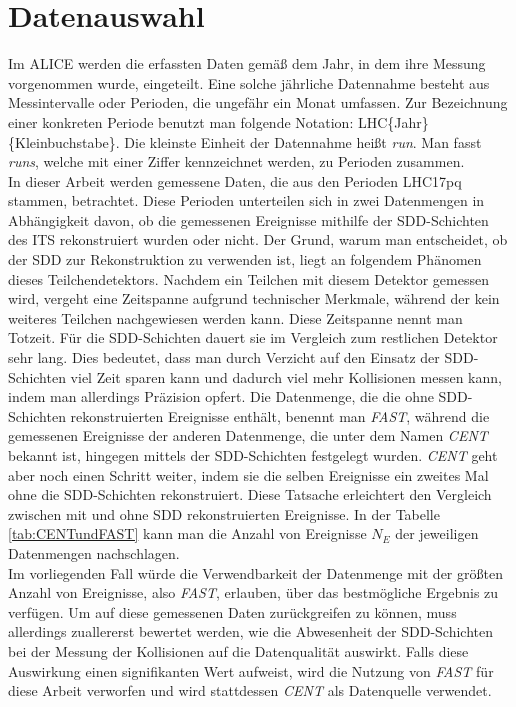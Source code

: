 \documentclass[12pt,a4paper]{report}
\begin{document}
\section{Datenauswahl}
Im ALICE werden die erfassten Daten gemäß dem Jahr, in dem ihre Messung vorgenommen wurde, eingeteilt. Eine solche jährliche Datennahme besteht aus Messintervalle oder Perioden, die ungefähr ein Monat umfassen. Zur Bezeichnung einer konkreten Periode benutzt man folgende Notation: LHC\{Jahr\}\{Kleinbuchstabe\}. Die kleinste Einheit der Datennahme heißt \textit{run}. Man fasst \textit{runs}, welche mit einer Ziffer kennzeichnet werden, zu Perioden zusammen.\\
In dieser Arbeit werden gemessene Daten, die aus den Perioden LHC17pq stammen, betrachtet. Diese Perioden unterteilen sich in zwei Datenmengen in Abhängigkeit davon, ob die gemessenen Ereignisse mithilfe der SDD-Schichten des ITS rekonstruiert wurden oder nicht. Der Grund, warum man entscheidet, ob der SDD zur Rekonstruktion zu verwenden ist, liegt an folgendem Phänomen dieses Teilchendetektors. Nachdem ein Teilchen mit diesem Detektor gemessen wird, vergeht eine Zeitspanne aufgrund technischer Merkmale, während der kein weiteres Teilchen nachgewiesen werden kann. Diese Zeitspanne nennt man Totzeit. Für die SDD-Schichten dauert sie im Vergleich zum restlichen Detektor sehr lang. Dies bedeutet, dass man durch Verzicht auf den Einsatz der SDD-Schichten viel Zeit sparen kann und dadurch viel mehr Kollisionen messen kann, indem man allerdings Präzision opfert. Die Datenmenge, die die ohne SDD-Schichten rekonstruierten Ereignisse enthält, benennt man \textit{FAST}, während die gemessenen Ereignisse der anderen Datenmenge, die unter dem Namen \textit{CENT} bekannt ist, hingegen mittels der SDD-Schichten festgelegt wurden. \textit{CENT} geht aber noch einen Schritt weiter, indem sie die selben Ereignisse ein zweites Mal ohne die SDD-Schichten rekonstruiert. Diese Tatsache erleichtert den Vergleich zwischen mit und ohne SDD rekonstruierten Ereignisse. In der Tabelle \ref{tab:CENTundFAST} kann man die Anzahl von Ereignisse $N_{E}$ der jeweiligen Datenmengen nachschlagen.\\
Im vorliegenden Fall würde die Verwendbarkeit der Datenmenge mit der größten Anzahl von Ereignisse, also \textit{FAST}, erlauben, über das bestmögliche Ergebnis zu verfügen. Um auf diese gemessenen Daten zurückgreifen zu können, muss allerdings zuallererst bewertet werden, wie die Abwesenheit der SDD-Schichten bei der Messung der Kollisionen auf die Datenqualität auswirkt. Falls diese Auswirkung einen signifikanten Wert aufweist, wird die Nutzung von \textit{FAST} für diese Arbeit verworfen und wird stattdessen \textit{CENT} als Datenquelle verwendet.
\end{document}
